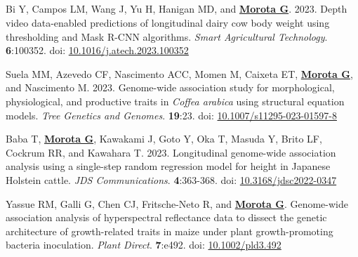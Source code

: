 \documentclass[margin,line,10pt]{res}
\newenvironment{list1}{
  \begin{list}{\ding{113}}{%
      \setlength{\itemsep}{0in}
      \setlength{\parsep}{0in} \setlength{\parskip}{0in}
      \setlength{\topsep}{0in} \setlength{\partopsep}{0in} 
      \setlength{\leftmargin}{0.17in}}}{\end{list}}
\begin{document}
\begin{resume}
\section{}
\begin{list1}


  \item  [{\bf 69}.]  Bi Y, Campos LM, Wang J, Yu H, Hanigan MD, and \textbf{\underline{Morota G}}. 2023. Depth video data-enabled predictions of longitudinal dairy cow body weight using thresholding and Mask R-CNN algorithms. \emph{Smart Agricultural Technology}. \textbf{6}:100352. doi: \textcolor{blue}{\href{https://doi.org/10.1016/j.atech.2023.100352}{10.1016/j.atech.2023.100352}}

  \vspace{0.5cm}

  \item  [{\bf 68}.] Suela MM, Azevedo CF, Nascimento ACC, Momen M, Caixeta ET, \textbf{\underline{Morota G}}, and Nascimento M. 2023. Genome-wide association study for morphological, physiological, and productive traits in \textit{Coffea arabica} using structural equation models. \emph{Tree Genetics and Genomes}. \textbf{19}:23. doi: \textcolor{blue}{\href{https://doi.org/10.1007/s11295-023-01597-8}{10.1007/s11295-023-01597-8}} 

      \vspace{0.5cm}

  \item  [{\bf 67}.] Baba T, \textbf{\underline{Morota G}}, Kawakami J, Goto Y, Oka T, Masuda Y, Brito LF, Cockrum RR, and Kawahara T. 2023. Longitudinal genome-wide association analysis using a single-step random regression model for height in Japanese Holstein cattle.  \emph{JDS Communications}. \textbf{4}:363-368. doi: \textcolor{blue}{\href{https://doi.org/10.3168/jdsc2022-0347}{10.3168/jdsc2022-0347}} 


  \vspace{0.5cm}

  \item [{\bf 66}.] Yassue RM, Galli G, Chen CJ, Fritsche-Neto R, and \textbf{\underline{Morota G}}.  Genome-wide association analysis of hyperspectral reflectance data to dissect the genetic architecture of growth-related traits in maize under plant growth-promoting bacteria inoculation. \emph{Plant Direct}. \textbf{7}:e492. doi: \textcolor{blue}{\href{https://doi.org/10.1002/pld3.492}{10.1002/pld3.492}}  

  \vspace{0.5cm}


\end{list1}
\end{resume}
\end{document}
